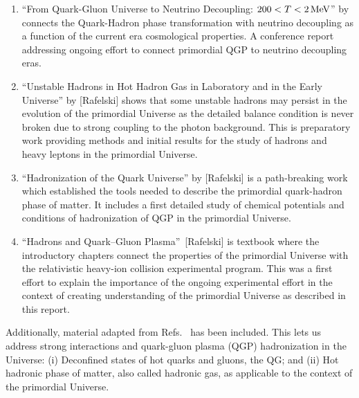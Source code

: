 \begin{enumerate}
%
\item ``From Quark-Gluon Universe to Neutrino Decoupling: $200 < T < 2\text{\,MeV}$'' by  {\color{blue} connects the Quark-Hadron phase transformation with neutrino decoupling as a function of the current era cosmological properties. A conference report addressing ongoing effort to connect primordial QGP to neutrino decoupling eras.}
%
\item ``Unstable Hadrons in Hot Hadron Gas in Laboratory and in the Early Universe'' by [Rafelski] shows that some unstable hadrons may persist in the evolution of the primordial Universe as the detailed balance condition is never broken due to strong coupling to the photon background. {\color{blue} This is preparatory work providing methods and initial results for the study of hadrons and heavy leptons in the primordial Universe.}
%
\item ``Hadronization of the Quark Universe'' by [Rafelski] is {\color{blue} a path-breaking work which established the tools needed to describe the primordial quark-hadron phase of matter.} It includes a first detailed study of chemical potentials and conditions of hadronization of QGP in the primordial Universe. 
%
\item {\color{blue}``Hadrons and Quark–Gluon Plasma''~[Rafelski] is textbook where the introductory chapters connect the properties of the primordial Universe with the relativistic heavy-ion collision experimental program. This was a first effort to explain the importance of the ongoing experimental effort in the context of creating understanding of the primordial Universe as described in this report.}
\end{enumerate}
Additionally, material adapted from Refs.~\cite{Rafelski:2019twp,Rafelski:2016hnq,Rafelski:2015cxa} has been included. This lets us address strong interactions and quark-gluon plasma (QGP) hadronization in the Universe: (i) Deconfined states of hot quarks and gluons, the QG; and (ii) Hot hadronic phase of matter, also called hadronic gas, as applicable to the context of the primordial Universe. 
